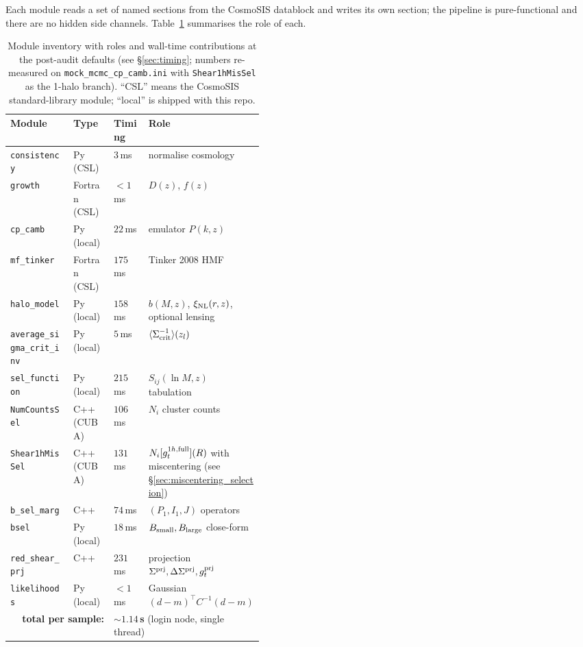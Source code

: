 \documentclass[a4paper, 11pt]{article}
\newcommand{\xinl}{\xi_{\rm NL}}
\newcommand{\Sprj}{\Sigma^{\rm prj}}
\newcommand{\DSprj}{\Delta\Sigma^{\rm prj}}
\newcommand{\Bsmall}{B_{\rm small}}
\newcommand{\Blarge}{B_{\rm large}}
\newcommand{\modname}[1]{\textcolor{kwcol}{\texttt{#1}}}
\begin{document}
Each module reads a set of named sections from the CosmoSIS datablock
and writes its own section; the pipeline is pure-functional and there
are no hidden side channels.  Table~\ref{tab:module-roles} summarises
the role of each.

\begin{table}[H]
\centering
\small
\begin{tabular}{@{}l l l p{0.43\linewidth}@{}}
\toprule
Module & Type & Timing & Role \\
\midrule
\modname{consistency}            & Py (CSL)   & $3$\,ms  & normalise cosmology \\
\modname{growth}                 & Fortran (CSL) & $<1$\,ms & $D(z)$, $f(z)$ \\
\modname{cp\_camb}               & Py (local)   & $22$\,ms & emulator $P(k,z)$ \\
\modname{mf\_tinker}             & Fortran (CSL) & $175$\,ms & Tinker 2008 HMF \\
\modname{halo\_model}            & Py (local)   & $158$\,ms & $b(M,z)$, $\xinl(r,z)$, optional lensing \\
\modname{average\_sigma\_crit\_inv} & Py (local) & $5$\,ms & $\langle\Sigma_{\rm crit}^{-1}\rangle(z_l)$ \\
\modname{sel\_function}          & Py (local)   & $215$\,ms & $S_{ij}(\ln M, z)$ tabulation \\
\modname{NumCountsSel}           & C++ (CUBA)   & $106$\,ms & $N_i$ cluster counts \\
\modname{Shear1hMisSel}          & C++ (CUBA)   & $131$\,ms & $N_i[g_t^{1h,{\rm full}}](R)$ with miscentering (see \S\ref{sec:miscentering_selection}) \\
\modname{b\_sel\_marg}           & C++          & $74$\,ms & $(P_1, I_1, J)$ operators \\
\modname{bsel}                   & Py (local)   & $18$\,ms & $\Bsmall, \Blarge$ close-form \\
\modname{red\_shear\_prj}        & C++          & $231$\,ms & projection $\Sprj, \DSprj, g_t^{\rm prj}$ \\
\modname{likelihoods}            & Py (local)   & $<1$\,ms & Gaussian $(d-m)^{\!\top}\!C^{-1}\!(d-m)$ \\
\midrule
\multicolumn{2}{r}{\textbf{total per sample:}} & \multicolumn{2}{l}{\textbf{$\sim 1.14$\,s} (login node, single thread)} \\
\bottomrule
\end{tabular}
\caption{Module inventory with roles and wall-time contributions at
the post-audit defaults (see \S\ref{sec:timing}; numbers re-measured
on \texttt{mock\_mcmc\_cp\_camb.ini} with \modname{Shear1hMisSel} as
the 1-halo branch). ``CSL'' means the CosmoSIS standard-library
module; ``local'' is shipped with this repo.}
\label{tab:module-roles}
\end{table}
\end{document}
